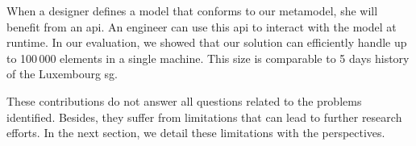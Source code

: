 When a designer defines a \gls{model} that conforms to our \gls{metamodel}, she will benefit from an \gls{api}.
An engineer can use this \gls{api} to interact with the \gls{model} at runtime.
In our evaluation, we showed that our solution can efficiently handle up to 100\,000 elements in a single machine. 
This size is comparable to 5 days history of the Luxembourg \gls{sg}.

These contributions do not answer all questions related to the problems identified.
Besides, they suffer from limitations that can lead to further research efforts.
In the next section, we detail these limitations with the perspectives.